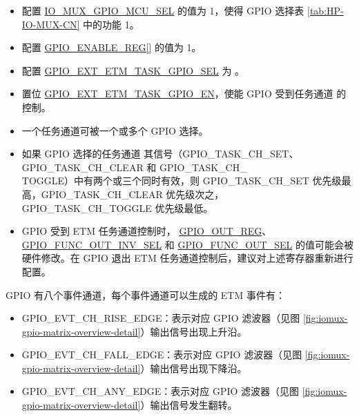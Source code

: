 \documentclass[main\_\_CN.tex]{subfiles}
\begin{document}
\begin{itemize}
    \item 配置 \hyperref[fielddesc:IOMUXGPIONMCUSEL]{IO\_MUX\_GPIO\_MCU\_SEL} 的值为 1，使得 GPIO 选择表  \ref{tab:HP-IO-MUX-CN} 中的功能 1。
    \item 配置 \hyperref[regdesc:GPIOENABLEREG]{GPIO\_ENABLE\_REG[]} 的值为 1。
    \item 配置  \hyperref[fielddesc:GPIOSDETMTASKGPIO0SEL]{GPIO\_EXT\_ETM\_TASK\_GPIO\_SEL} 为  。
    \item 置位  \hyperref[fielddesc:GPIOSDETMTASKGPIO0EN]{GPIO\_EXT\_ETM\_TASK\_GPIO\_EN}，使能 GPIO 受到任务通道   的控制。
\end{itemize}

\begin{tiplisting}
\vspace{-2em}
\begin{itemize}
\item 一个任务通道可被一个或多个 GPIO 选择。

\item 如果 GPIO 选择的任务通道  其信号（GPIO\_TASK\_CH\_SET、GPIO\_TASK\_CH\_CLEAR 和 GPIO\_TASK\_CH\_\\TOGGLE）中有两个或三个同时有效，则 GPIO\_TASK\_CH\_SET 优先级最高，GPIO\_TASK\_CH\_CLEAR 优先级次之，GPIO\_TASK\_CH\_TOGGLE 优先级最低。

\item GPIO 受到 ETM 任务通道控制时， \hyperref[regdesc:GPIOOUTREG]{GPIO\_OUT\_REG}、 \hyperref[fielddesc:GPIOFUNCNOUTINVSEL]{GPIO\_FUNC\_OUT\_INV\_SEL} 和  \hyperref[fielddesc:GPIOFUNCNOUTSEL]{GPIO\_FUNC\_OUT\_SEL} 的值可能会被硬件修改。在 GPIO 退出 ETM 任务通道控制后，建议对上述寄存器重新进行配置。
\end{itemize}
\end{tiplisting}

GPIO 有八个事件通道，每个事件通道可以生成的 ETM 事件有：

\begin{itemize}
    \item GPIO\_EVT\_CH\_RISE\_EDGE：表示对应 GPIO 滤波器（见图  \ref{fig:iomux-gpio-matrix-overview-detail}）输出信号出现上升沿。
    \item GPIO\_EVT\_CH\_FALL\_EDGE：表示对应 GPIO 滤波器（见图  \ref{fig:iomux-gpio-matrix-overview-detail}）输出信号出现下降沿。
    \item GPIO\_EVT\_CH\_ANY\_EDGE：表示对应 GPIO 滤波器（见图  \ref{fig:iomux-gpio-matrix-overview-detail}）输出信号发生翻转。
\end{itemize}
\end{document}
